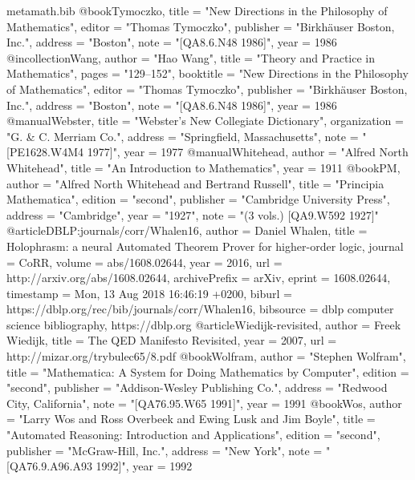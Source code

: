 \begin{filecontents}{metamath.bib}
@book{Tymoczko,
  title = "New Directions in the Philosophy of Mathematics",
  editor = "Thomas Tymoczko",
  publisher = "Birkh{\"{a}}user Boston, Inc.",
  address = "Boston",
  note = "[QA8.6.N48 1986]",
  year = 1986 }
@incollection{Wang,
  author = "Hao Wang",
  title = "Theory and Practice in Mathematics",
  pages = "129--152",
  booktitle = "New Directions in the Philosophy of Mathematics",
  editor = "Thomas Tymoczko",
  publisher = "Birkh{\"{a}}user Boston, Inc.",
  address = "Boston",
  note = "[QA8.6.N48 1986]",
  year = 1986 }
@manual{Webster,
  title = "Webster's New Collegiate Dictionary",
  organization = "G. \& C. Merriam Co.",
  address = "Springfield, Massachusetts",
  note = "[PE1628.W4M4 1977]",
  year = 1977 }
@manual{Whitehead, author = "Alfred North Whitehead",
  title = "An Introduction to Mathematics",
  year = 1911 }
@book{PM, author = "Alfred North Whitehead and Bertrand Russell",
  title = "Principia Mathematica",
  edition = "second",
  publisher = "Cambridge University Press",
  address = "Cambridge",
  year = "1927",
  note = "(3 vols.) [QA9.W592 1927]" }
@article{DBLP:journals/corr/Whalen16,
  author    = {Daniel Whalen},
  title     = {Holophrasm: a neural Automated Theorem Prover for higher-order logic},
  journal   = {CoRR},
  volume    = {abs/1608.02644},
  year      = {2016},
  url       = {http://arxiv.org/abs/1608.02644},
  archivePrefix = {arXiv},
  eprint    = {1608.02644},
  timestamp = {Mon, 13 Aug 2018 16:46:19 +0200},
  biburl    = {https://dblp.org/rec/bib/journals/corr/Whalen16},
  bibsource = {dblp computer science bibliography, https://dblp.org} }
@article{Wiedijk-revisited,
  author = {Freek Wiedijk},
  title = {The QED Manifesto Revisited},
  year = {2007},
  url = {http://mizar.org/trybulec65/8.pdf} }
@book{Wolfram,
  author = "Stephen Wolfram",
  title = "Mathematica:  A System for Doing Mathematics by Computer",
  edition = "second",
  publisher = "Addison-Wesley Publishing Co.",
  address = "Redwood City, California",
  note = "[QA76.95.W65 1991]",
  year = 1991 }
@book{Wos, author = "Larry Wos and Ross Overbeek and Ewing Lusk and Jim Boyle",
  title = "Automated Reasoning:  Introduction and Applications",
  edition = "second",
  publisher = "McGraw-Hill, Inc.",
  address = "New York",
  note = "[QA76.9.A96.A93 1992]",
  year = 1992 }

%
%
%
%


\end{filecontents}
